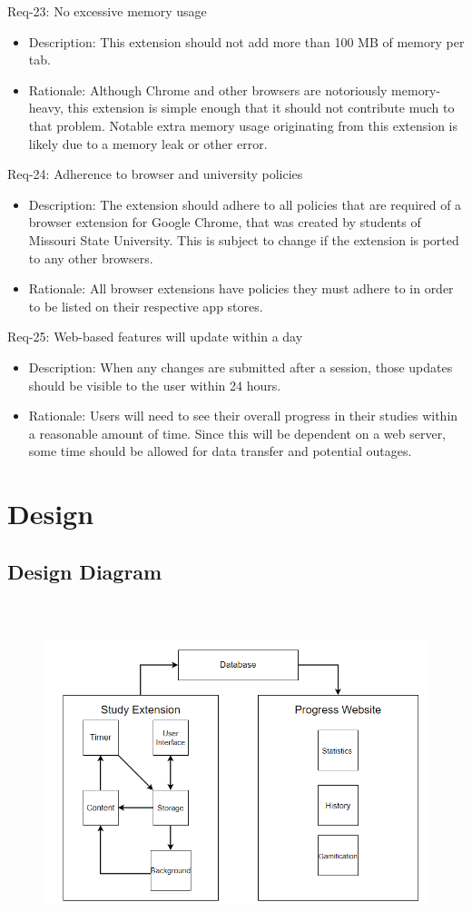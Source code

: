 \documentclass[12pt]{article}
\begin{document}
Req-23:  No excessive memory usage
\begin{itemize}
    \item Description: This extension should not add more than 100 MB of memory per tab.
    \item Rationale: Although Chrome and other browsers are notoriously memory-heavy, this extension is simple enough that it should not contribute much to that problem. Notable extra memory usage originating from this extension is likely due to a memory leak or other error.
\end{itemize}
Req-24: Adherence to browser and university policies
\begin{itemize}
    \item Description: The extension should adhere to all policies that are required of a browser extension for Google Chrome, that was created by students of Missouri State University. This is subject to change if the extension is ported to any other browsers.
    \item Rationale: All browser extensions have policies they must adhere to in order to be listed on their respective app stores.
\end{itemize}
Req-25: Web-based features will update within a day
\begin{itemize}
    \item Description: When any changes are submitted after a session, those updates should be visible to the user within 24 hours.
    \item Rationale: Users will need to see their overall progress in their studies within a reasonable amount of time. Since this will be dependent on a web server, some time should be allowed for data transfer and potential outages.
\end{itemize}
\pagebreak
\section{Design}
\subsection{Design Diagram}
\begin{figure}[h]
\includegraphics[width=15.0cm, height=10.0cm]{images/Design.png}
\end{figure}
\end{document}
